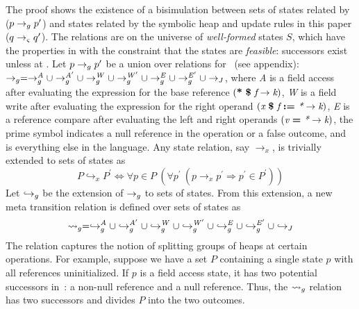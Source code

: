 The proof shows the existence of a
bisimulation between sets of states related by~\gsetxt{} ($p \rightarrow_{g}
p^\prime$) and states related by the symbolic heap and update rules in this paper ($q \rightarrow_{\varsigma}
q^\prime$). The relations are on the universe of \emph{well-formed}
states $S$, which have the properties in  with the
constraint that the states are \emph{feasible}: successors exist
unless at . Let $p \rightarrow_{g} p^\prime$ be a union over relations
for~\gsetxt{} (see appendix): $\rightarrow_{g} = \rightarrow_{g}^\mathit{A} \cup
\rightarrow_{g}^\mathit{A^\prime} \cup \rightarrow_{g}^\mathit{W} \cup
\rightarrow_{g}^\mathit{W^\prime} \cup \rightarrow_{g}^\mathit{E} \cup
\rightarrow_{g}^\mathit{E^\prime} \cup \rightarrow_{J}$, where \emph{A} is a field access
after evaluating the expression for the base reference $(
\textbf{*}\ \textbf{\$}\ \emph{f} \rightarrow \emph{k})$, \emph{W} is
a field write after evaluating the expression for the right operand
$\lp \cfgnt{x}\ \cfgt{\$}\ \cfgnt{f}\ \cfgt{:=}\ \cfgnt{*} \rightarrow
\cfgnt{k}\rp$, \emph{E} is a reference compare after evaluating the
left and right operands $\lp \cfgnt{v}\ \cfgt{=}\ \cfgnt{*}
\rightarrow \cfgnt{k}\rp$, the prime symbol indicates a null reference
in the operation or a false outcome, and \emph{\com} is everything
else in the language. Any state relation, say $\rightarrow_x$, is
trivially extended to sets of states as
$$
P \hookrightarrow_x P^\prime \Longleftrightarrow \forall p \in P\ (\forall p^\prime\ (p \rightarrow_x p^\prime \Rightarrow p^\prime \in P^\prime))
$$
Let $\hookrightarrow_{g}$ be the extension of $\rightarrow_{g}$ to sets of
states. From this extension, a new meta transition relation is defined
over sets of states as
$$
\leadsto_{g} = \hookrightarrow_{g}^\mathit{A}
\cup \hookrightarrow_{g}^\mathit{A^\prime} \cup \hookrightarrow_{g}^\mathit{W} \cup
\hookrightarrow_{g}^\mathit{W^\prime} \cup \hookrightarrow_{g}^\mathit{E} \cup \hookrightarrow_{g}^\mathit{E^\prime}
\cup \hookrightarrow_{J}
$$
The relation captures the notion of splitting groups of heaps at
certain operations. For example, suppose we have a set $P$ containing a single state $p$
with all references uninitialized. If $p$ is a field access state, it has two
potential successors in~\gsetxt{}: a non-null reference and a null reference. 
Thus, the $\leadsto_{g}$ relation has two successors and divides $P$ into the two outcomes.

